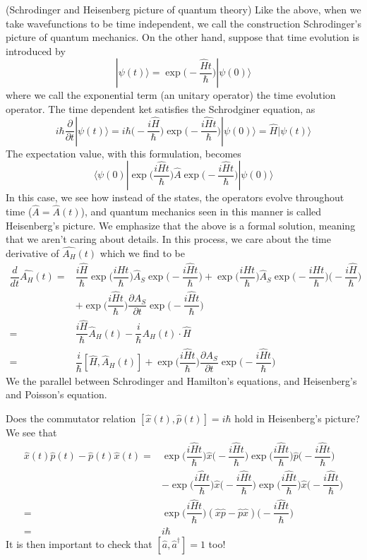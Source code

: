 \begin{defi}
(Schrodinger and Heisenberg picture of quantum theory) Like the above, when we take wavefunctions to be time independent, we call the construction Schrodinger's picture of quantum mechanics. On the other hand, suppose that time evolution is introduced by 
\[|\psi (t)\rangle=\exp \Big(-\dfrac{\hat{H}t}{\hbar }\Big)|\psi (0)\rangle  \]
where we call the exponential term (an unitary operator) the time evolution operator. The time dependent ket satisfies the Schrodginer equation, as
\[i\hbar \dfrac{\partial }{\partial t}|\psi (t)\rangle =i\hbar \Big(-\dfrac{i\hat{H}}{\hbar }\Big)\exp \Big(-\dfrac{\hat{iH}t}{\hbar }\Big)|\psi (0)\rangle =\hat{H}|\psi (t)\rangle  \]
The expectation value, with this formulation, becomes
\[\langle \psi (0)|\exp \Big(\dfrac{i\hat{H}t}{\hbar }\Big)\hat{A}\exp \Big(-\dfrac{i\hat{H}t}{\hbar }\Big)|\psi (0)\rangle \]
In this case, we see how instead of the states, the operators evolve throughout time ($\hat{A}=\hat{A}(t)$), and quantum mechanics seen in this manner is called Heisenberg's picture. We emphasize that the above is a formal solution, meaning that we aren't caring about details. In this process, we care about the time derivative of $\hat{A_{H}}(t)$ which we find to be
\begin{align*}
\dfrac{d }{d t}\hat{A_{H}}(t)=&\dfrac{i\hat{H}}{\hbar }\exp \Big(\dfrac{iHt}{\hbar }\Big)\hat{A}_{S}\exp \Big(-\dfrac{i\hat{H}t}{\hbar }\Big)+\exp \Big(\dfrac{iHt}{\hbar }\Big)\hat{A}_{S}\exp \Big(-\dfrac{iHt}{\hbar }\Big)\Big(-\dfrac{i\hat{H}}{\hbar }\Big)\\
&+\exp \Big(\dfrac{i\hat{H}t}{\hbar }\Big)\dfrac{\partial A_{S}}{\partial t}\exp \Big(-\dfrac{i\hat{H}t}{\hbar }\Big) \\
=&\dfrac{i\hat{H}}{\hbar }\hat{A}_{H}(t)-\dfrac{i}{\hbar }A_{H}(t)\cdot \hat{H}\\=&\dfrac{i}{\hbar }[\hat{H},\hat{A}_{H}(t)]+\exp \Big(\dfrac{i\hat{H}t}{\hbar }\Big)\dfrac{\partial A_{S}}{\partial t}\exp \Big(-\dfrac{i\hat{H}t}{\hbar }\Big) 
\end{align*}
We the parallel between Schrodinger and Hamilton's equations, and Heisenberg's and Poisson's equation.
\end{defi}
\vspace{2ex}
\begin{prop}
Does the commutator relation $[\hat{x}(t),\hat{p}(t)]=i\hbar $ hold in Heisenberg's picture? We see that
\begin{align*}
\hat{x}(t)\hat{p}(t)-\hat{p}(t)\hat{x}(t)=&\exp \Big(\dfrac{i\hat{H}t}{\hbar }\Big)\hat{x}\Big(-\dfrac{i\hat{H}t}{\hbar }\Big)\exp \Big(\dfrac{i\hat{H}t}{\hbar }\Big)\hat{p}\Big(-\dfrac{i\hat{H}t}{\hbar }\Big)\\&-\exp \Big(\dfrac{i\hat{H}t}{\hbar }\Big)\hat{x}\Big(-\dfrac{i\hat{H}t}{\hbar }\Big)\exp \Big(\dfrac{i\hat{H}t}{\hbar }\Big)\hat{x}\Big(-\dfrac{i\hat{H}t}{\hbar }\Big)\\
=&\exp \Big(\dfrac{i\hat{H}t}{\hbar }\Big)(\hat{x}\hat{p}-\hat{p}\hat{x})\Big(-\dfrac{i\hat{H}t}{\hbar }\Big)\\
=&i\hbar 
\end{align*}
It is then important to check that $[\hat{a},\hat{a}^{\dagger}]=1$ too!
\end{prop}
\vspace{2ex}


